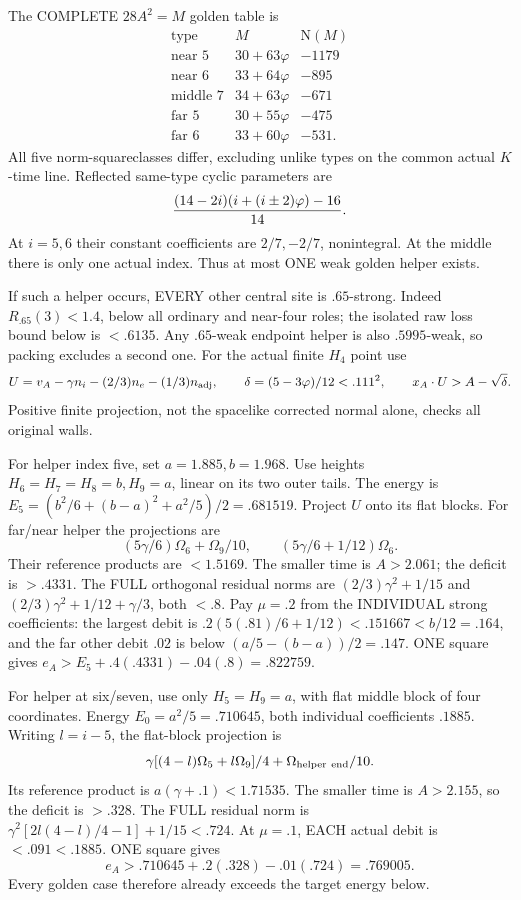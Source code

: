 The COMPLETE \(28A^2=M\) golden table is
\[
\begin{array}{c|c|r}
 \text{type}&M&\mathrm N(M)\\ \hline
 \text{near }5&30+63\varphi&-1179\\
 \text{near }6&33+64\varphi&-895\\
 \text{middle }7&34+63\varphi&-671\\
 \text{far }5&30+55\varphi&-475\\
 \text{far }6&33+60\varphi&-531 .
\end{array}
\]
All five norm-squareclasses differ, excluding
unlike types on the common actual \(K\)-time line.
Reflected same-type cyclic parameters are
\[
                  { (14-2i)(i+(i\pm2)\varphi)-16\over14}.
\]
At \(i=5,6\) their constant coefficients are
\(2/7,-2/7\), nonintegral.
At the middle there is only one actual index.
Thus at most ONE weak golden helper exists.

If such a helper occurs, EVERY other central
site is \(.65\)-strong.
Indeed \(R_{.65}(3)<1.4\), below all ordinary
and near-four roles; the isolated raw loss
bound below is \(<.6135\).
Any \(.65\)-weak endpoint helper is also
\(.5995\)-weak, so packing excludes a second one.
For the actual finite \(H_4\) point use
\[
 U=v_A-\gamma n_i-(2/3)n_e-(1/3)n_{\rm adj},
 \qquad\delta=(5-3\varphi)/12<.111^2,
 \qquad x_A\cdot U>A-\sqrt\delta .
\]
Positive finite projection, not the spacelike
corrected normal alone, checks all original
walls.

For helper index five, set \(a=1.885,b=1.968\).
Use heights \(H_6=H_7=H_8=b,H_9=a\), linear
on its two outer tails.
The energy is
\(E_5=(b^2/6+(b-a)^2+a^2/5)/2=.681519\).
Project \(U\) onto its flat blocks.
For far/near helper the projections are
\[
 (5\gamma/6)\Omega_6+\Omega_9/10,\qquad
 (5\gamma/6+1/12)\Omega_6 .
\]
Their reference products are \(<1.5169\).
The smaller time is \(A>2.061\); the deficit
is \(>.4331\).
The FULL orthogonal residual norms are
\((2/3)\gamma^2+1/15\) and
\((2/3)\gamma^2+1/12+\gamma/3\), both \(<.8\).
Pay \(\mu=.2\) from the INDIVIDUAL strong
coefficients: the largest debit is
\(.2(5(.81)/6+1/12)<.151667<b/12=.164\),
and the far other debit \(.02\) is below
\((a/5-(b-a))/2=.147\).
ONE square gives
\(e_A>E_5+.4(.4331)-.04(.8)=.822759\).

For helper at six/seven, use only
\(H_5=H_9=a\), with flat middle block of four
coordinates.
Energy \(E_0=a^2/5=.710645\), both individual
coefficients \(.1885\).
Writing \(l=i-5\), the flat-block projection is
\[
 \gamma[(4-l)\Omega_5+l\Omega_9]/4
                         +\Omega_{\rm helper\ end}/10 .
\]
Its reference product is
\(a(\gamma+.1)<1.71535\).
The smaller time is \(A>2.155\), so the
deficit is \(>.328\).
The FULL residual norm is
\(\gamma^2[2l(4-l)/4-1]+1/15<.724\).
At \(\mu=.1\), EACH actual debit is
\(<.091<.1885\).
ONE square gives
\[
                           e_A>.710645+.2(.328)-.01(.724)
                                      =.769005 .
\]
Every golden case therefore already exceeds
the target energy below.

